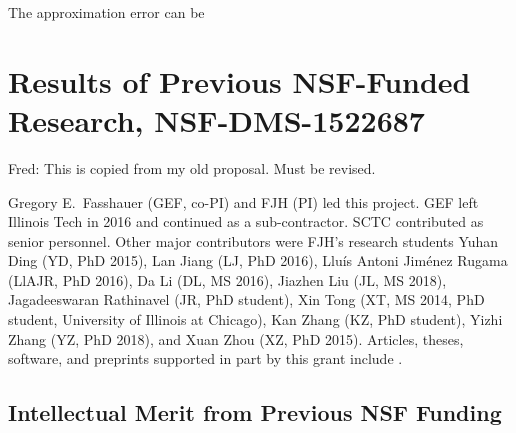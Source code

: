 \documentclass[11pt]{NSFamsart}
\newcommand{\FJHNote}[1]{{\color{blue}Fred: #1}}
\begin{document}
The approximation error can be 

\section{Results of Previous NSF-Funded Research,
NSF-DMS-1522687} \label{sec:Previous}
\FJHNote{This is copied from my old proposal.  Must be revised.}

Gregory E.\ Fasshauer (GEF, co-PI) and FJH (PI) led this project.  GEF left Illinois Tech in 2016 and continued as a sub-contractor.  
SCTC contributed as senior personnel.  Other major contributors were FJH's research students Yuhan Ding (YD, PhD 2015), Lan Jiang (LJ, PhD 2016), 
Llu\'is Antoni Jim\'enez Rugama (LlAJR, PhD 2016), Da Li (DL, MS 2016), Jiazhen Liu (JL, MS 2018), Jagadeeswaran Rathinavel (JR, 
PhD student), Xin Tong (XT, MS 2014, PhD student, University of Illinois at Chicago), Kan Zhang (KZ, PhD 
student), Yizhi Zhang (YZ, PhD 2018), and Xuan Zhou (XZ, PhD 2015).  Articles, theses,  
software, and preprints supported in 
part by this 
grant 
include 
\cite{ala_augmented_2017, 
	ChoEtal17a,
	ChoEtal17b,
	Din15a, 
	DinHic20a,
	GilEtal16a,
	Hic17a,
	HicJag18b,
	HicJim16a,
	HicEtal18a,
	HicEtal17a,
	HicKriWoz19a,
	RatHic19a,
	GilJim16b,
	JimHic16a,
	JohFasHic18a,
	Li16a,
	Liu17a,
	MarEtal18a,
	mccourt_stable_2017,
	MCCEtal19a,
	mishra_hybrid_2018,
	MisEtal19a,
	rashidinia_stable_2016,
	rashidinia_stable_2018,
	Zha18a,
	Zha17a,
	Zho15a,
	ZhoHic15a}.

\subsection{Intellectual Merit from Previous NSF Funding}
\label{previousmeritsubsec}

\end{document}
